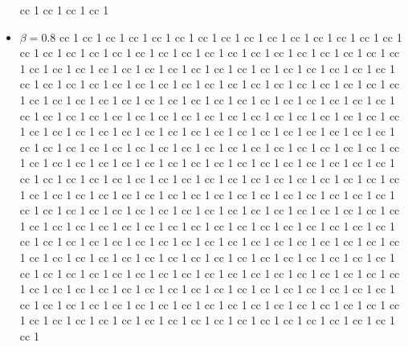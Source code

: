\documentclass[11pt]{article}
\begin{document}
\begin{itemize}
 cc 1  cc 1  cc 1  cc 1
\item $\beta=0.8$ cc 1  cc 1  cc 1  cc 1  cc 1  cc 1  cc 1  cc 1  cc 1  cc 1  cc 1  cc 1  cc 1  cc 1  cc 1  cc 1  cc 1  cc 1  cc 1  cc 1  cc 1  cc 1  cc 1  cc 1  cc 1  cc 1  cc 1  cc 1  cc 1  cc 1  cc 1  cc 1  cc 1  cc 1  cc 1  cc 1  cc 1  cc 1  cc 1  cc 1  cc 1  cc 1  cc 1  cc 1  cc 1  cc 1  cc 1  cc 1  cc 1  cc 1  cc 1  cc 1  cc 1  cc 1  cc 1  cc 1  cc 1  cc 1  cc 1  cc 1  cc 1  cc 1  cc 1  cc 1  cc 1  cc 1  cc 1  cc 1  cc 1  cc 1  cc 1  cc 1  cc 1  cc 1  cc 1  cc 1  cc 1  cc 1  cc 1  cc 1  cc 1  cc 1  cc 1  cc 1  cc 1  cc 1  cc 1  cc 1  cc 1  cc 1  cc 1  cc 1  cc 1  cc 1  cc 1  cc 1  cc 1  cc 1  cc 1  cc 1  cc 1  cc 1  cc 1  cc 1  cc 1  cc 1  cc 1  cc 1  cc 1  cc 1  cc 1  cc 1  cc 1  cc 1  cc 1  cc 1  cc 1  cc 1  cc 1  cc 1  cc 1  cc 1  cc 1  cc 1  cc 1  cc 1  cc 1  cc 1  cc 1  cc 1  cc 1  cc 1  cc 1  cc 1  cc 1  cc 1  cc 1  cc 1  cc 1  cc 1  cc 1  cc 1  cc 1  cc 1  cc 1  cc 1  cc 1  cc 1  cc 1  cc 1  cc 1  cc 1  cc 1  cc 1  cc 1  cc 1  cc 1  cc 1  cc 1  cc 1  cc 1  cc 1  cc 1  cc 1  cc 1  cc 1  cc 1  cc 1  cc 1  cc 1  cc 1  cc 1  cc 1  cc 1  cc 1  cc 1  cc 1  cc 1  cc 1  cc 1  cc 1  cc 1  cc 1  cc 1  cc 1  cc 1  cc 1  cc 1  cc 1  cc 1  cc 1  cc 1  cc 1  cc 1  cc 1  cc 1  cc 1  cc 1  cc 1  cc 1  cc 1  cc 1  cc 1  cc 1  cc 1  cc 1  cc 1  cc 1  cc 1  cc 1  cc 1  cc 1  cc 1  cc 1  cc 1  cc 1  cc 1  cc 1  cc 1  cc 1  cc 1  cc 1  cc 1  cc 1  cc 1  cc 1  cc 1  cc 1  cc 1  cc 1  cc 1  cc 1  cc 1  cc 1  cc 1  cc 1  cc 1  cc 1  cc 1  cc 1  cc 1  cc 1  cc 1  cc 1  cc 1  cc 1  cc 1  cc 1  cc 1  cc 1  cc 1  cc 1  cc 1  cc 1  cc 1  cc 1  cc 1  cc 1  cc 1  cc 1  cc 1  cc 1  cc 1  cc 1  cc 1  cc 1  cc 1  cc 1  cc 1  cc 1  cc 1  cc 1  cc 1  cc 1  cc 1  cc 1  cc 1  cc 1  cc 1  cc 1  cc 1  cc 1  cc 1  cc 1  cc 1  cc 1  cc 1  cc 1  cc 1  cc 1  cc 1  cc 1  cc 1  cc 1  cc 1  cc 1  cc 1  cc 1  cc 1  cc 1  cc 1  cc 1  cc 1  cc 1  cc 1  cc 1  cc 1  cc 1  cc 1  cc 1  cc 1  cc 1  cc 1
\end{itemize}
\end{document}
